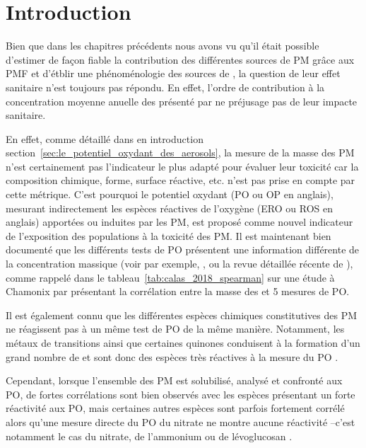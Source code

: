 \section{Introduction}
Bien que dans les chapitres précédents nous avons vu qu'il était possible d'estimer de
façon fiable la contribution des différentes sources de PM grâce aux PMF et d'étblir une
phénoménologie des sources de \PMdix, la question de leur effet sanitaire n'est toujours
pas répondu. En effet, l'ordre de contribution à la concentration moyenne anuelle des
\PMdix{} présenté par \cite[(figure 3)]{weberComparison2019} ne préjusage pas de leur impacte
sanitaire.

En effet, comme détaillé dans en introduction
section~\ref{sec:le_potentiel_oxydant_des_aerosols}, la mesure de la masse des PM n'est
certainement pas l'indicateur le plus adapté pour évaluer leur toxicité car la composition
chimique, forme, surface réactive, etc. n'est pas prise en compte par cette métrique.
C'est pourquoi le potentiel oxydant (PO ou OP en anglais), mesurant indirectement les
espèces réactives de l'oxygène (ERO ou ROS en anglais) apportées ou induites par les PM,
est proposé comme nouvel indicateur de l'exposition des populations à la toxicité des PM. 
Il est maintenant bien documenté que les différents tests de PO présentent une information
différente de la concentration massique (voir par exemple,
\cite{choRedox2005,vermaReactive2014,batesReactive2015,fangOxidative2016,fangAmbient2017,calasSeasonal2019},
ou la revue détaillée récente de \cite{batesReview2019}), comme rappelé dans le
tableau~\ref{tab:calas_2018_spearman} sur une étude à Chamonix par
\cite{calasComparison2018} présentant la corrélation entre la masse des \PMdix{} et 5
mesures de PO.

Il est également connu que les différentes espèces chimiques constitutives des PM ne
réagissent pas à un même test de PO de la même manière. Notamment, les métaux de
transitions  ainsi que certaines quinones conduisent à la formation d'un grand nombre de
 et sont donc des espèces très réactives à la mesure du PO
\autocite{charrierRates2015,calasImportance2017}.

Cependant, lorsque l'ensemble des PM est solubilisé, analysé et confronté aux PO, de
fortes corrélations sont bien observés avec les espèces présentant un forte réactivité aux
PO, mais certaines autres espèces sont parfois fortement corrélé alors qu'une mesure
directe du PO du nitrate ne montre aucune réactivité --c'est notamment le cas du nitrate,
de l'ammonium ou de lévoglucosan \autocite{vermaRedox2009,calasComparison2018,calasSeasonal2019}.

